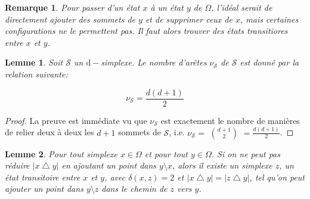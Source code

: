 \documentclass[11pt]{article}
\newtheorem{lemme}{Lemme}[subsection]
\newtheorem{remarque}{Remarque}[subsection]
\begin{document}
\begin{remarque}\label{rmq:difsym}
  Pour passer d'un état $x$ à un état $y$ de $\Omega$, l'idéal serait de directement ajouter des sommets de $y$ et de supprimer ceux de $x$, mais certaines configurations ne le permettent pas. Il faut alors trouver des états transitiores entre $x$ et $y$.
\end{remarque}

\begin{lemme}\label{lem:nb-aretes-simplexe}
  Soit $\mathcal{S}$ un $\mathrm{d}-$simplexe. Le nombre d'arêtes $\nu_\mathcal{S}$ de $\mathcal{S}$ est donné par la relation suivante:

  \begin{equation}
    \nu_\mathcal{S} = \frac{d(d+1)}{2}
  \end{equation}
\end{lemme}

\begin{proof}
  La preuve est immédiate vu que $\nu_\mathcal{S}$ est exactement le nombre de manières de relier deux à deux les $d+1$ sommets de $\mathcal{S}$, i.e. $\nu_\mathcal{S} =$ ${d+1}\choose{2}$ $=\frac{d(d+1)}{2}$.
\end{proof}

\begin{lemme}\label{lem:elim-mauvais-cas}
  Pour tout simplexe $x \in \Omega$ et pour tout $y \in \Omega$. Si on ne peut pas réduire $|x \bigtriangleup y|$ en ajoutant un point dans $y \setminus x$, alors il existe un simplexe $z$, un état transitoire entre $x$ et $y$, avec $\delta(x,z) = 2$ et $|x \bigtriangleup y| = |z \bigtriangleup y|$, tel qu'on peut ajouter un point dans $y \setminus z$ dans le chemin de $z$ vers $y$.
\end{lemme}
\end{document}
